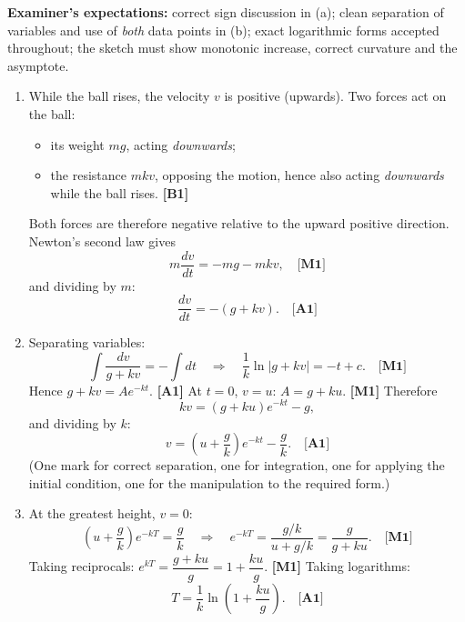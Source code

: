 \documentclass[11pt]{article}
\begin{document}
\begin{corrige}
\medskip
\textbf{Examiner's expectations:} correct sign discussion in (a); clean separation of variables and use of \emph{both} data points in (b); exact logarithmic forms accepted throughout; the sketch must show monotonic increase, correct curvature and the asymptote.
\end{corrige}

\begin{corrige}
\begin{enumerate}
\item While the ball rises, the velocity $v$ is positive (upwards). Two forces act on the ball:
\begin{itemize}
\item its weight $mg$, acting \emph{downwards};
\item the resistance $mkv$, opposing the motion, hence also acting \emph{downwards} while the ball rises. \hfill \textbf{[B1]}
\end{itemize}
Both forces are therefore negative relative to the upward positive direction. Newton's second law gives
\[
m\frac{dv}{dt} = -mg - mkv, \quad \textbf{[M1]}
\]
and dividing by $m$:
\[
\boxed{\frac{dv}{dt} = -(g + kv)}. \quad \textbf{[A1]}
\]

\item Separating variables:
\[
\int \frac{dv}{g + kv} = -\int dt
\quad\Longrightarrow\quad \frac{1}{k}\ln|g + kv| = -t + c. \quad \textbf{[M1]}
\]
Hence $g + kv = Ae^{-kt}$. \textbf{[A1]} At $t = 0$, $v = u$: $A = g + ku$. \textbf{[M1]} Therefore
\[
kv = (g + ku)e^{-kt} - g,
\]
and dividing by $k$:
\[
\boxed{v = \left(u + \frac{g}{k}\right)e^{-kt} - \frac{g}{k}}. \quad \textbf{[A1]}
\]
(One mark for correct separation, one for integration, one for applying the initial condition, one for the manipulation to the required form.)

\item At the greatest height, $v = 0$:
\[
\left(u + \frac{g}{k}\right)e^{-kT} = \frac{g}{k}
\quad\Longrightarrow\quad e^{-kT} = \frac{g/k}{u + g/k} = \frac{g}{g + ku}. \quad \textbf{[M1]}
\]
Taking reciprocals: $e^{kT} = \dfrac{g + ku}{g} = 1 + \dfrac{ku}{g}$. \textbf{[M1]} Taking logarithms:
\[
\boxed{T = \frac{1}{k}\ln\left(1 + \frac{ku}{g}\right)}. \quad \textbf{[A1]}
\]


\end{enumerate}
\end{corrige}
\end{document}
